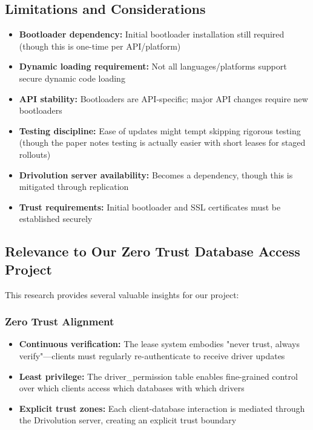 \subsection{Limitations and Considerations}

\begin{itemize}
    \item \textbf{Bootloader dependency:} Initial bootloader installation still required (though this is one-time per API/platform)
    \item \textbf{Dynamic loading requirement:} Not all languages/platforms support secure dynamic code loading
    \item \textbf{API stability:} Bootloaders are API-specific; major API changes require new bootloaders
    \item \textbf{Testing discipline:} Ease of updates might tempt skipping rigorous testing (though the paper notes testing is actually easier with short leases for staged rollouts)
    \item \textbf{Drivolution server availability:} Becomes a dependency, though this is mitigated through replication
    \item \textbf{Trust requirements:} Initial bootloader and SSL certificates must be established securely
\end{itemize}

\subsection{Relevance to Our Zero Trust Database Access Project}

This research provides several valuable insights for our project:

\subsubsection{Zero Trust Alignment}

\begin{itemize}
    \item \textbf{Continuous verification:} The lease system embodies "never trust, always verify"—clients must regularly re-authenticate to receive driver updates
    \item \textbf{Least privilege:} The driver\_permission table enables fine-grained control over which clients access which databases with which drivers
    \item \textbf{Explicit trust zones:} Each client-database interaction is mediated through the Drivolution server, creating an explicit trust boundary
\end{itemize}

